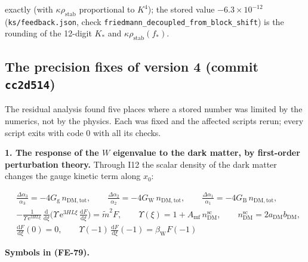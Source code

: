 \documentclass[
  10pt,
]{article}
\begin{document}
exactly (with \(\kappa\rho_{\mathrm{stab}}\) proportional to \(K^4\));
the stored value \(-6.3\times10^{-12}\) (\texttt{ks/feedback.json},
check \texttt{friedmann\_decoupled\_from\_block\_shift}) is the rounding
of the 12-digit \(K_*\) and \(\kappa\rho_{\mathrm{stab}}(f_*)\).

\hypertarget{the-precision-fixes-of-version-4-commit-cc2d514}{%
\subsection{\texorpdfstring{The precision fixes of version 4 (commit
\texttt{cc2d514})}{The precision fixes of version 4 (commit cc2d514)}}\label{the-precision-fixes-of-version-4-commit-cc2d514}}

The residual analysis found five places where a stored number was
limited by the numerics, not by the physics. Each was fixed and the
affected scripts rerun; every script exits with code 0 with all its
checks.

\textbf{1. The response of the \(W\) eigenvalue to the dark matter, by
first-order perturbation theory.} Through I12 the scalar density of the
dark matter changes the gauge kinetic term along \(x_0\):

\[
\begin{aligned}
&\frac{\Delta\alpha_3}{\alpha_3} = -4G_{\mathrm{g}}\,n_{\mathrm{DM,tot}},\qquad
 \frac{\Delta\alpha_2}{\alpha_2} = -4G_{\mathrm{W}}\,n_{\mathrm{DM,tot}},\qquad
 \frac{\Delta\alpha_1}{\alpha_1} = -4G_{\mathrm{B}}\,n_{\mathrm{DM,tot}},\\
&-\frac{1}{\Upsilon\,\mathrm{e}^{3HL\xi}}\,\frac{\mathrm{d}}{\mathrm{d}\xi}\Big(\Upsilon\,
 \mathrm{e}^{3HL\xi}\,\frac{\mathrm{d}F}{\mathrm{d}\xi}\Big)
 = \tilde m^2F,\qquad \Upsilon(\xi) = 1 + A_{\mathrm{mf}}\,n^{\mathrm{sc}}_{\mathrm{DM}},\qquad
 n^{\mathrm{sc}}_{\mathrm{DM}} = 2a_{\mathrm{DM}}b_{\mathrm{DM}},\\
&\frac{\mathrm{d}F}{\mathrm{d}\xi}(0) = 0,\qquad \Upsilon(-1)\,\frac{\mathrm{d}F}{\mathrm{d}\xi}(-1) =
 \beta_{\mathrm{W}}F(-1)
\end{aligned} \tag{FE-79}
\]

\textbf{Symbols in (FE-79).}
\end{document}
